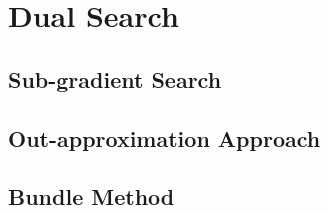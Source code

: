 \documentclass{article}
\begin{document}
\section{Dual Search} 

\subsection{Sub-gradient Search}
 
\subsection{Out-approximation Approach}

\subsection{Bundle Method}
 
% 
% 
\end{document}
